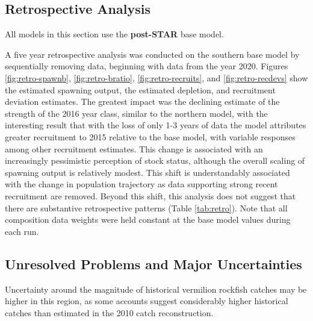 \documentclass[11pt,
  english,
]{article}
\begin{document}

\hypertarget{retrospective-analysis}{%
\subsection{Retrospective Analysis}\label{retrospective-analysis}}

\leavevmode\tagmcend\tagstructend

All models in this section use the \textbf{post-STAR} base model.

A five year retrospective analysis was conducted on the southern base model by sequentially removing data, beginning with data from the year 2020. Figures \ref{fig:retro-spawnb}, \ref{fig:retro-bratio}, \ref{fig:retro-recruits}, and \ref{fig:retro-recdevs} show the estimated spawning output, the estimated depletion, and recruitment deviation estimates. The greatest impact was the declining estimate of the strength of the 2016 year class, similar to the northern model, with the interesting result that with the loss of only 1-3 years of data the model attributes greater recruitment to 2015 relative to the base model, with variable responses among other recruitment estimates. This change is associated with an increasingly pessimistic perception of stock status, although the overall scaling of spawning output is relatively modest. This shift is understandably associated with the change in population trajectory as data supporting strong recent recruitment are removed. Beyond this shift, this analysis does not suggest that there are substantive retrospective patterns (Table \ref{tab:retro}). Note that all composition data weights were held constant at the base model values during each run.


\hypertarget{unresolved-problems-and-major-uncertainties-1}{%
\subsection{Unresolved Problems and Major Uncertainties}\label{unresolved-problems-and-major-uncertainties-1}}

\leavevmode\tagmcend\tagstructend

Uncertainty around the magnitude of historical vermilion rockfish catches may be higher in this region, as some accounts suggest considerably higher historical catches than estimated in the 2010 catch reconstruction.
\end{document}
